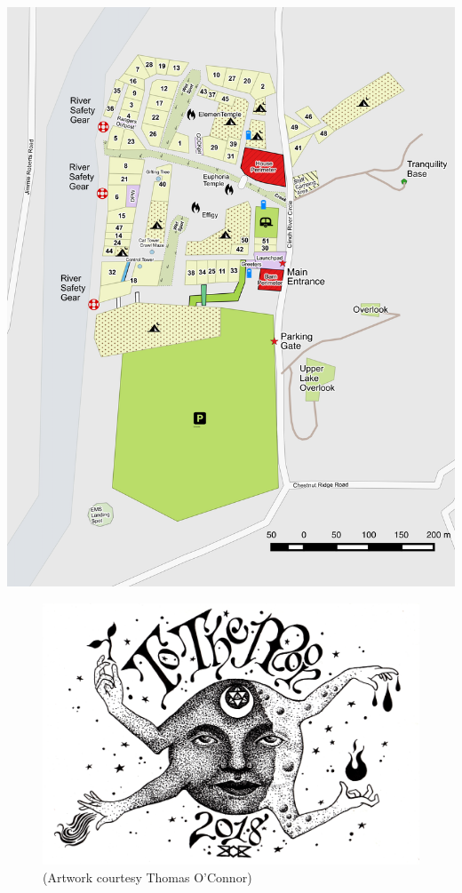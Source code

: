 \vspace*{\fill}
\begin{center}
	\includegraphics[width=.95\textwidth]{images/TTM2018}
\end{center}
\vspace*{\fill}

\clearpage
\thispagestyle{empty}
\begin{figure}[h!]
	\centering
	\includegraphics[angle=90,width=\textwidth]{images/TTM2018_smaller}
    \small
    (Artwork courtesy Thomas O'Connor)
\end{figure}
